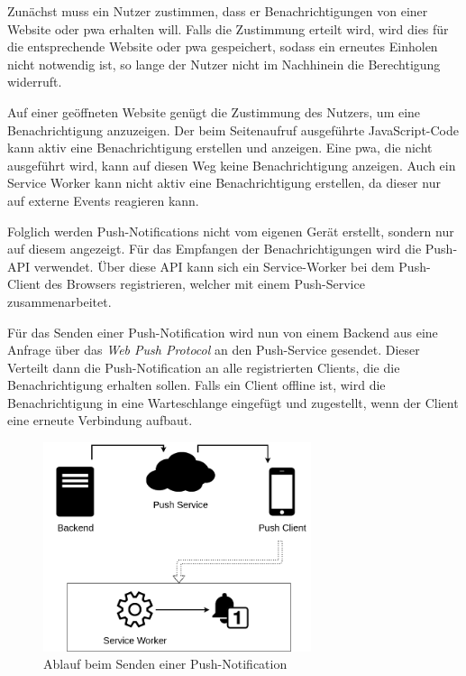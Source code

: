 \documentclass[12pt, parskip=half]{scrartcl}       %
\begin{document}
Zunächst muss ein Nutzer zustimmen, dass er Benachrichtigungen von einer Website oder \ac{pwa} erhalten will.
Falls die Zustimmung erteilt wird, wird dies für die entsprechende Website oder \ac{pwa} gespeichert, sodass ein erneutes Einholen nicht notwendig ist, so lange der Nutzer nicht im Nachhinein die Berechtigung widerruft.

Auf einer geöffneten Website genügt die Zustimmung des Nutzers, um eine Benachrichtigung anzuzeigen.
Der beim Seitenaufruf ausgeführte JavaScript-Code kann aktiv eine Benachrichtigung erstellen und anzeigen.
Eine \ac{pwa}, die nicht ausgeführt wird, kann auf diesen Weg keine Benachrichtigung anzeigen.
Auch ein Service Worker kann nicht aktiv eine Benachrichtigung erstellen, da dieser nur auf externe Events reagieren kann.

Folglich werden Push-Notifications nicht vom eigenen Gerät erstellt, sondern nur auf diesem angezeigt.
Für das Empfangen der Benachrichtigungen wird die Push-API\cite{w3c_pushapi} verwendet.
Über diese API kann sich ein Service-Worker bei dem Push-Client des Browsers registrieren, welcher mit einem Push-Service zusammenarbeitet.

Für das Senden einer Push-Notification wird nun von einem Backend aus eine Anfrage über das \textit{Web Push Protocol}\cite{ietf_webpush} an den Push-Service gesendet.
Dieser Verteilt dann die Push-Notification an alle registrierten Clients, die die Benachrichtigung erhalten sollen.
Falls ein Client offline ist, wird die Benachrichtigung in eine Warteschlange eingefügt und zugestellt, wenn der Client eine erneute Verbindung aufbaut\cite{googledev_webpush}.

\begin{figure}[h]
  \centering
  \includegraphics[width=0.7\textwidth]{src/Push-API.png}
  \caption{Ablauf beim Senden einer Push-Notification}
  \label{fig:push_api}
\end{figure}
\end{document}
